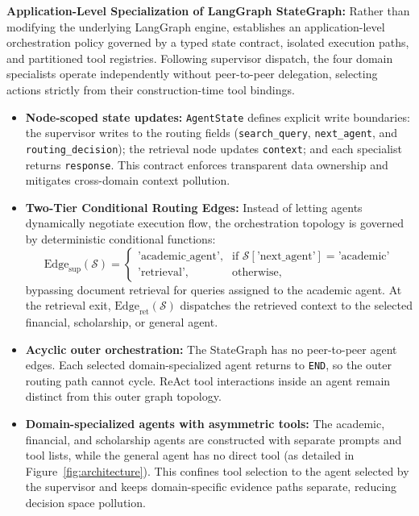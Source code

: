 \textbf{Application-Level Specialization of LangGraph StateGraph:}
Rather than modifying the underlying LangGraph engine, \system{} establishes an application-level orchestration policy governed by a typed state contract, isolated execution paths, and partitioned tool registries. Following supervisor dispatch, the four domain specialists operate independently without peer-to-peer delegation, selecting actions strictly from their construction-time tool bindings.
\begin{itemize}
    \setlength{\itemsep}{1.5pt}
    \setlength{\parsep}{0pt}
    \setlength{\parskip}{0pt}
    \item \textbf{Node-scoped state updates:} \texttt{AgentState} defines explicit write boundaries: the supervisor writes to the routing fields (\texttt{search\_query}, \texttt{next\_agent}, and \texttt{routing\_decision}); the retrieval node updates \texttt{context}; and each specialist returns \texttt{response}. This contract enforces transparent data ownership and mitigates cross-domain context pollution.
    
    \item \textbf{Two-Tier Conditional Routing Edges:} Instead of letting agents dynamically negotiate execution flow, the orchestration topology is governed by deterministic conditional functions:
    \begin{equation}
        \mathrm{Edge}_{\text{sup}}(\mathcal{S}) = \begin{cases}
            \text{'academic\_agent'}, & \text{if } \mathcal{S}[\text{'next\_agent'}] = \text{'academic'} \\
            \text{'retrieval'}, & \text{otherwise},
        \end{cases}
    \end{equation}
    bypassing document retrieval for queries assigned to the academic agent. At the retrieval exit, $\mathrm{Edge}_{\text{ret}}(\mathcal{S})$ dispatches the retrieved context to the selected financial, scholarship, or general agent.
    
    \item \textbf{Acyclic outer orchestration:} The StateGraph has no peer-to-peer agent edges. Each selected domain-specialized agent returns to \texttt{END}, so the outer routing path cannot cycle. ReAct tool interactions inside an agent remain distinct from this outer graph topology.
    
    \item \textbf{Domain-specialized agents with asymmetric tools:} The academic, financial, and scholarship agents are constructed with separate prompts and tool lists, while the general agent has no direct tool (as detailed in Figure~\ref{fig:architecture}). This confines tool selection to the agent selected by the supervisor and keeps domain-specific evidence paths separate, reducing decision space pollution.
\end{itemize}

